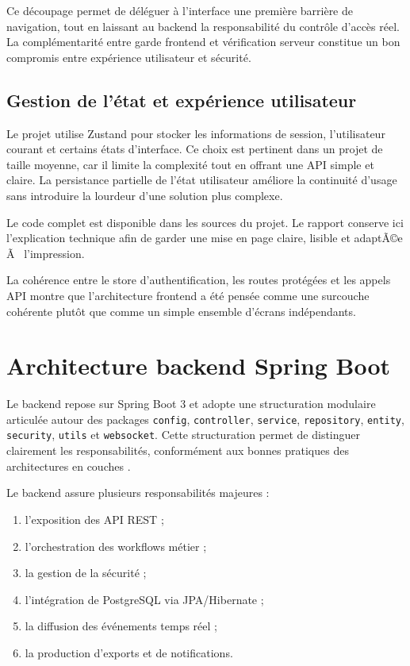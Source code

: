 ﻿\documentclass[12pt,a4paper,oneside]{report}
\newenvironment{codeblock}[1][]{
  \par
  \captionsetup{type=figure}
}{
  \par
}
\begin{document}
Ce découpage permet de déléguer à l'interface une première barrière de navigation, tout en laissant au backend la responsabilité du contrôle d'accès réel. La complémentarité entre garde frontend et vérification serveur constitue un bon compromis entre expérience utilisateur et sécurité.

\subsection{Gestion de l'état et expérience utilisateur}
Le projet utilise Zustand pour stocker les informations de session, l'utilisateur courant et certains états d'interface. Ce choix est pertinent dans un projet de taille moyenne, car il limite la complexité tout en offrant une API simple et claire. La persistance partielle de l'état utilisateur améliore la continuité d'usage sans introduire la lourdeur d'une solution plus complexe.

\begin{codeblock}[H]
\caption{Gestion centralisée de l'authentification côté frontend}
\begin{keybox}
Le code complet est disponible dans les sources du projet. Le rapport conserve ici l'explication technique afin de garder une mise en page claire, lisible et adaptÃ©e Ã  l'impression.
\end{keybox}
\end{codeblock}

La cohérence entre le store d'authentification, les routes protégées et les appels API montre que l'architecture frontend a été pensée comme une surcouche cohérente plutôt que comme un simple ensemble d'écrans indépendants.

\section{Architecture backend Spring Boot}
Le backend repose sur Spring Boot 3 et adopte une structuration modulaire articulée autour des packages \texttt{config}, \texttt{controller}, \texttt{service}, \texttt{repository}, \texttt{entity}, \texttt{security}, \texttt{utils} et \texttt{websocket}. Cette structuration permet de distinguer clairement les responsabilités, conformément aux bonnes pratiques des architectures en couches \cite{fowler2002,springdocs}.

Le backend assure plusieurs responsabilités majeures :
\begin{enumerate}
  \item l'exposition des API REST ;
  \item l'orchestration des workflows métier ;
  \item la gestion de la sécurité ;
  \item l'intégration de PostgreSQL via JPA/Hibernate ;
  \item la diffusion des événements temps réel ;
  \item la production d'exports et de notifications.
\end{enumerate}
\end{document}
